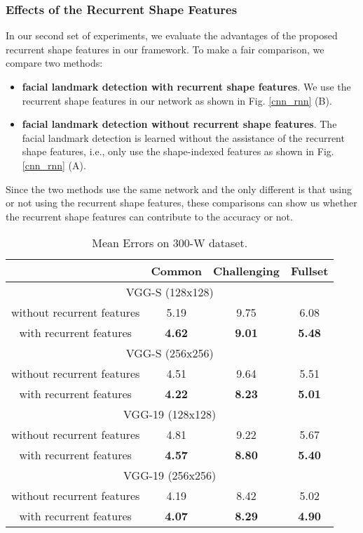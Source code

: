 \documentclass[journal]{IEEEtran}
\begin{document}
\subsubsection{Effects of the Recurrent Shape Features}
In our second set of experiments, we evaluate the advantages of the proposed recurrent shape features in our framework. To make a fair comparison, we compare two methods:
\begin{itemize}
\item \textbf{facial landmark detection with recurrent shape features}. We use the recurrent shape features in our network as shown in Fig.  \ref{cnn_rnn} (B).

\item \textbf{facial landmark detection without recurrent shape features}. The facial landmark detection is learned without the assistance of the recurrent shape features, i.e., only use the shape-indexed features as shown in Fig. \ref{cnn_rnn} (A).
\end{itemize}

Since the two methods use the same network and the only different is that using or not using the recurrent shape features, these comparisons can show us whether the recurrent shape features can contribute to the accuracy or not.

\begin{table}[h]
\small
    \centering \caption{Mean Errors on 300-W dataset.}
    \begin{tabular}{c|c c c}
      \hline
    & Common & Challenging & Fullset \\
        \hline
          \multicolumn{4}{c}{VGG-S (128x128)}\\
          \hline
         without recurrent features  & 5.19 & 9.75 & 6.08 \\
         with recurrent features  & \textbf{4.62} & \textbf{9.01} & \textbf{5.48} \\
         \hline
          \multicolumn{4}{c}{VGG-S (256x256)}\\
          \hline
       without recurrent features  & 4.51 & 9.64 & 5.51 \\
       with recurrent features  &\textbf{ 4.22} & \textbf{8.23} &\textbf{5.01} \\
        \hline
         \multicolumn{4}{c}{VGG-19 (128x128)}\\
          \hline
        without recurrent features & 4.81 & 9.22 & 5.67 \\
        with recurrent features &\textbf{ 4.57} &\textbf{8.80} & \textbf{5.40} \\
        \hline
          \multicolumn{4}{c}{VGG-19 (256x256)}\\
          \hline
        without recurrent features & 4.19 & 8.42 & 5.02\\
        with recurrent features &\textbf{ 4.07} & \textbf{8.29} & \textbf{4.90}\\
        \hline
        \end{tabular}
    \label{compare_rsf}
\end{table}
\end{document}
